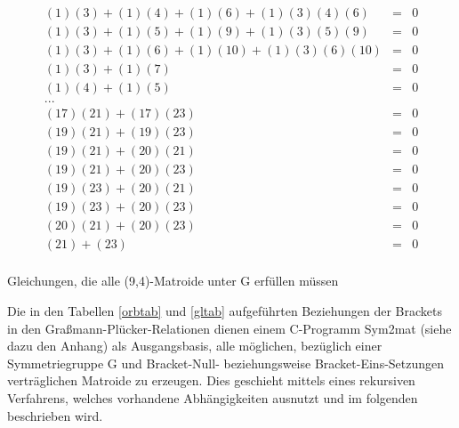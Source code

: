 \begin{table}[htb]
{\small
$$
\begin{array}{lll}
(1)(3)+(1)(4)+(1)(6)+(1)(3)(4)(6) & = & 0 \\
(1)(3)+(1)(5)+(1)(9)+(1)(3)(5)(9) & = & 0 \\
(1)(3)+(1)(6)+(1)(10)+(1)(3)(6)(10) & = & 0 \\
(1)(3)+(1)(7) & = & 0 \\
(1)(4)+(1)(5) & = & 0 \\
... & & \\
(17)(21)+(17)(23) & = & 0 \\
(19)(21)+(19)(23) & = & 0 \\
(19)(21)+(20)(21) & = & 0 \\
(19)(21)+(20)(23) & = & 0 \\
(19)(23)+(20)(21) & = & 0 \\
(19)(23)+(20)(23) & = & 0 \\
(20)(21)+(20)(23) & = & 0 \\
(21)+(23) & = & 0 \\
\end{array}$$}
\caption{Gleichungen, die alle (9,4)-Matroide unter G erfüllen müssen}
\label{gltab}
\end{table}

Die in den Tabellen \ref{orbtab} und \ref{gltab} aufgeführten Beziehungen
der Brackets in den Graßmann-Plücker-Relationen dienen einem C-Programm
{\sc Sym2mat} (siehe dazu den Anhang) als Ausgangsbasis, alle möglichen,
bezüglich einer Symmetriegruppe G und Bracket-Null- beziehungsweise
Bracket-Eins-Setzungen verträglichen Matroide zu erzeugen. Dies geschieht
mittels eines rekursiven Verfahrens, welches vorhandene Abhängigkeiten
ausnutzt und im folgenden beschrieben wird.

